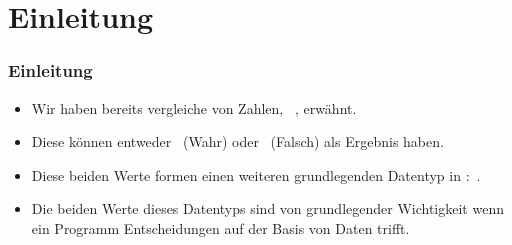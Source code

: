 \documentclass[aspectratio=169,mathserif,notheorems]{beamer}%
\subtitle{10.~Der Datentyp bool}%
\begin{document}
%
%
\startPresentation%
%
\section{Einleitung}%
\begin{frame}%
\frametitle{Einleitung}%
\begin{itemize}%
\item Wir haben bereits vergleiche von Zahlen, \DEzB~, erwähnt.%
\item<2-> Diese können entweder ~(Wahr) oder ~(Falsch) als Ergebnis haben.%
\item<3-> Diese beiden Werte formen einen weiteren grundlegenden Datentyp in \python:~.%
\item<4-> Die beiden Werte dieses Datentyps sind von grundlegender Wichtigkeit wenn ein Programm Entscheidungen auf der Basis von Daten trifft.%
\end{itemize}%
\end{frame}%
%
\end{document}
